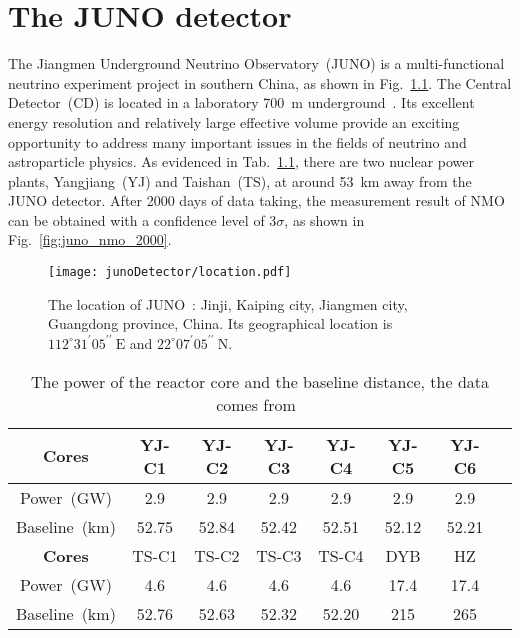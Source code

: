 \chapter{The JUNO detector}
The Jiangmen Underground Neutrino Observatory~(JUNO) is a multi-functional neutrino experiment project in southern China, as shown in Fig.~\ref{fig:juno_site}. The Central Detector~(CD) is located in a laboratory \SI{700}{m} underground~\cite{muon207}. Its excellent energy resolution and relatively large effective volume provide an exciting opportunity to address many important issues in the fields of neutrino and astroparticle physics. As evidenced in Tab.~\ref{tab:juno_core}, there are two nuclear power plants, Yangjiang~(YJ) and Taishan~(TS), at around \SI{53}{km} away from the JUNO detector. After 2000 days of data taking, the measurement result of NMO can be obtained with a confidence level of $3\sigma$, as shown in Fig.~\ref{fig:juno_nmo_2000}.

\begin{figure}[htbp]
	\centering
	\texttt{[image: junoDetector/location.pdf]}
	\caption{The location of JUNO~\cite{muon207}: Jinji, Kaiping city, Jiangmen city, Guangdong province, China. Its geographical location is $112^{\circ}31^{\prime}05^{\prime\prime}~\mathrm{E}$ and $22^{\circ}07^{\prime}05^{\prime\prime}~\mathrm{N}$.}
	\label{fig:juno_site}
\end{figure}

\begin{table}[htbp]
	\centering %
	\caption{The power of the reactor core and the baseline distance, the data comes from~\cite{juno_yellow_book}}
	\label{tab:juno_core}
	\begin{tabular}{cccccccc}
		\toprule %
		\textbf{Cores}     & YJ-C1 & YJ-C2 & YJ-C3 & YJ-C4 & YJ-C5 & YJ-C6 \\
		\midrule
		Power~(\si{GW})    & 2.9   & 2.9   & 2.9   & 2.9   & 2.9   & 2.9   \\
		Baseline~(\si{km}) & 52.75 & 52.84 & 52.42 & 52.51 & 52.12 & 52.21 \\
		\addlinespace
		\textbf{Cores}     & TS-C1 & TS-C2 & TS-C3 & TS-C4 & DYB   & HZ    \\
		\midrule
		Power~(\si{GW})    & 4.6   & 4.6   & 4.6   & 4.6   & 17.4  & 17.4  \\
		Baseline~(\si{km}) & 52.76 & 52.63 & 52.32 & 52.20 & 215   & 265   \\
		\bottomrule
	\end{tabular}
\end{table}

